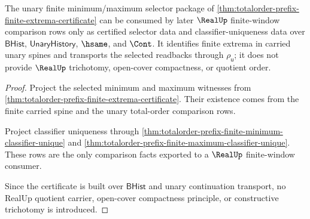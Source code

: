 \begin{theorem}
\label{thm:totalorder-unary-selector-real-window-consumer-boundary}
The unary finite minimum/maximum selector package of
\autoref{thm:totalorder-prefix-finite-extrema-certificate} can be consumed by
later $\RealUp$ finite-window comparison rows only as certified selector data
and classifier-uniqueness data over $\mathsf{BHist}$, $\mathsf{UnaryHistory}$,
$\hsame$, and $\Cont$.  It identifies finite extrema in carried unary spines
and transports the selected readbacks through $\rho_{\mathsf{u}}$; it does not
provide $\RealUp$ trichotomy, open-cover compactness, or quotient order.
\end{theorem}
\begin{proof}
Project the selected minimum and maximum witnesses from
\autoref{thm:totalorder-prefix-finite-extrema-certificate}.  Their existence
comes from the finite carried spine and the unary total-order comparison rows.

Project classifier uniqueness through
\autoref{thm:totalorder-prefix-finite-minimum-classifier-unique} and
\autoref{thm:totalorder-prefix-finite-maximum-classifier-unique}.  These rows
are the only comparison facts exported to a $\RealUp$ finite-window consumer.

Since the certificate is built over $\mathsf{BHist}$ and unary continuation
transport, no RealUp quotient carrier, open-cover compactness principle, or
constructive trichotomy is introduced.
\end{proof}
